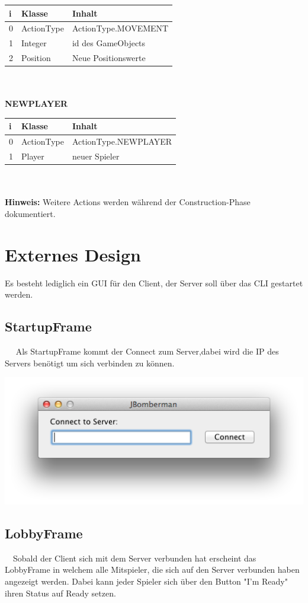 \documentclass[11pt]{scrartcl}
\begin{document}
\begin{tabularx}{\linewidth}{l l l}
\textbf{i} & \textbf{Klasse} & \textbf{Inhalt}\\
\hline
0 & ActionType & ActionType.MOVEMENT\\
1 & Integer & id des GameObjects\\
2 & Position & Neue Positionswerte\\
\end{tabularx}\\\\

\textbf{NEWPLAYER}\\

\begin{tabularx}{\linewidth}{l l l}
\textbf{i} & \textbf{Klasse} & \textbf{Inhalt}\\
\hline
0 & ActionType & ActionType.NEWPLAYER\\
1 & Player & neuer Spieler\\
\end{tabularx}\\\\

\textbf{Hinweis: } Weitere Actions werden während der Construction-Phase dokumentiert.

\newpage
\section{Externes Design}
Es besteht lediglich ein GUI für den Client, der Server soll über das CLI gestartet werden.
\subsection{StartupFrame} 
Als StartupFrame kommt der Connect zum Server,dabei wird die IP des Servers benötigt um sich verbinden zu können.

\includegraphics[scale=0.5]{StartupFrame}

\subsection{LobbyFrame}
 Sobald der Client sich mit dem Server verbunden hat erscheint das LobbyFrame in welchem alle Mitspieler, die sich auf den Server verbunden haben angezeigt werden.
Dabei kann jeder Spieler sich über den Button "I'm Ready" ihren Status auf Ready setzen. 
\end{document}
